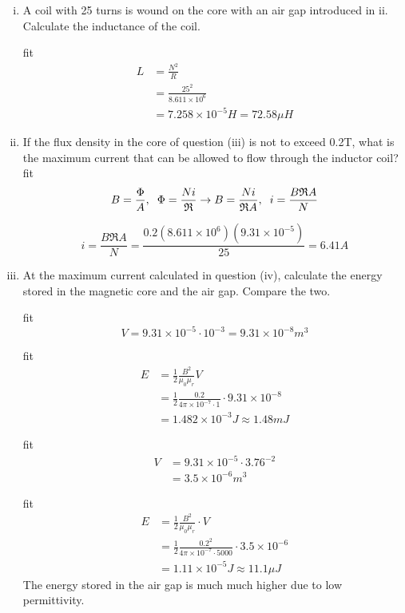 \documentclass[a4paper,11pt]{article}
\begin{document}
\begin{enumerate}[i.]
    \item A coil with 25 turns is wound on the core with an air gap introduced in ii. Calculate the inductance of the coil.

          fit
          \begin{align*}
              L & = \frac{N^2}{R}                     \\
                & =\frac{25^2}{8.611\times 10^6}      \\
                & = 7.258\times 10^{-5}H = 72.58\mu H
          \end{align*}

    \item If the flux density in the core of question (iii) is not to exceed 0.2T, what is the maximum current that can be allowed to flow through the inductor coil?
          fit
          $$B = \frac{\Phi}{A}, \hspace{2mm} \Phi = \frac{Ni}{\mathfrak{R}} \rightarrow B = \frac{Ni}{\mathfrak{R}A}, \hspace{2mm}i = \frac{B\mathfrak{R}A}{N}$$

          $$i = \frac{B\mathfrak{R}A}{N} = \frac{0.2(8.611\times10^6)(9.31\times 10^{-5})}{25} = 6.41A$$

          \newpage
    \item At the maximum current calculated in question (iv), calculate the energy stored in the magnetic core and the air gap. Compare the two.

          fit
          $$V = 9.31\times10^{-5}\cdot 10^{-3} = 9.31\times10^{-8}m^3$$

          fit
          \begin{align*}
              E & = \frac{1}{2}\frac{B^2}{\mu_0 \mu_r}V                                    \\
                & = \frac{1}{2}\frac{0.2}{4\pi\times10^{-7}\cdot 1}\cdot 9.31\times10^{-8} \\
                & = 1.482\times 10^{-3}J \approx 1.48m J
          \end{align*}

          fit
          \begin{align*}
              V & = 9.31\times10^{-5}\cdot 3.76^{-2} \\
                & = 3.5\times10^{-6}m^3
          \end{align*}

          fit
          \begin{align*}
              E & = \frac{1}{2}\frac{B^2}{\mu_0 \mu_r}\cdot V                                  \\
                & = \frac{1}{2}\frac{0.2^2}{4\pi\times10^{-7}\cdot 5000}\cdot 3.5\times10^{-6} \\
                & = 1.11\times 10^{-5}J \approx 11.1\mu J
          \end{align*}
          The energy stored in the air gap is much much higher due to low permittivity.
\end{enumerate}
\end{document}
